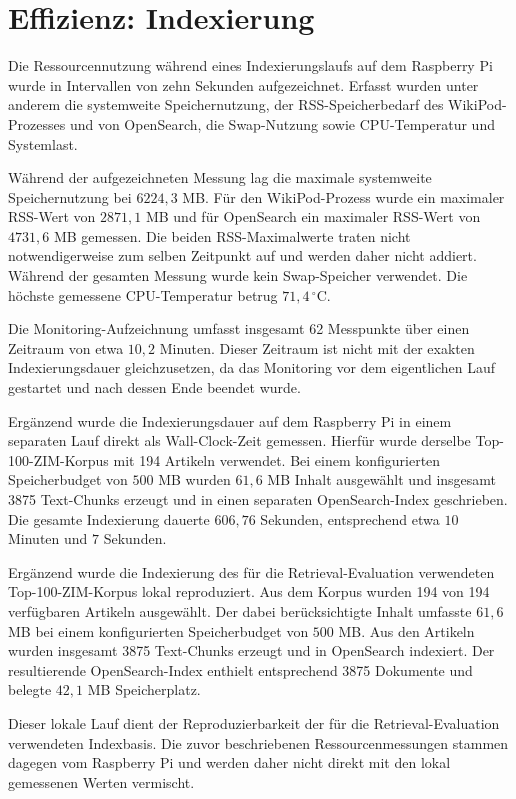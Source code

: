 \section{Effizienz: Indexierung}

Die Ressourcennutzung während eines Indexierungslaufs auf dem Raspberry Pi
wurde in Intervallen von zehn Sekunden aufgezeichnet. Erfasst wurden unter
anderem die systemweite Speichernutzung, der RSS-Speicherbedarf des
WikiPod-Prozesses und von OpenSearch, die Swap-Nutzung sowie CPU-Temperatur
und Systemlast.

Während der aufgezeichneten Messung lag die maximale systemweite
Speichernutzung bei $6224{,}3$ MB. Für den WikiPod-Prozess wurde ein
maximaler RSS-Wert von $2871{,}1$ MB und für OpenSearch ein maximaler
RSS-Wert von $4731{,}6$ MB gemessen. Die beiden RSS-Maximalwerte traten
nicht notwendigerweise zum selben Zeitpunkt auf und werden daher nicht
addiert. Während der gesamten Messung wurde kein Swap-Speicher verwendet.
Die höchste gemessene CPU-Temperatur betrug $71{,}4\,^\circ$C.

Die Monitoring-Aufzeichnung umfasst insgesamt 62 Messpunkte über einen
Zeitraum von etwa $10{,}2$ Minuten. Dieser Zeitraum ist nicht mit der
exakten Indexierungsdauer gleichzusetzen, da das Monitoring vor dem
eigentlichen Lauf gestartet und nach dessen Ende beendet wurde.

Ergänzend wurde die Indexierungsdauer auf dem Raspberry Pi in einem
separaten Lauf direkt als Wall-Clock-Zeit gemessen. Hierfür wurde derselbe
Top-100-ZIM-Korpus mit 194 Artikeln verwendet. Bei einem konfigurierten
Speicherbudget von $500$ MB wurden $61{,}6$ MB Inhalt ausgewählt und
insgesamt 3875 Text-Chunks erzeugt und in einen separaten OpenSearch-Index
geschrieben. Die gesamte Indexierung dauerte $606{,}76$ Sekunden, entsprechend
etwa $10$ Minuten und $7$ Sekunden.

Ergänzend wurde die Indexierung des für die Retrieval-Evaluation verwendeten
Top-100-ZIM-Korpus lokal reproduziert. Aus dem Korpus wurden 194 von 194
verfügbaren Artikeln ausgewählt. Der dabei berücksichtigte Inhalt umfasste
$61{,}6$ MB bei einem konfigurierten Speicherbudget von $500$ MB. Aus den
Artikeln wurden insgesamt 3875 Text-Chunks erzeugt und in OpenSearch
indexiert. Der resultierende OpenSearch-Index enthielt entsprechend 3875
Dokumente und belegte $42{,}1$ MB Speicherplatz.

Dieser lokale Lauf dient der Reproduzierbarkeit der für die
Retrieval-Evaluation verwendeten Indexbasis. Die zuvor beschriebenen
Ressourcenmessungen stammen dagegen vom Raspberry Pi und werden daher nicht
direkt mit den lokal gemessenen Werten vermischt.


